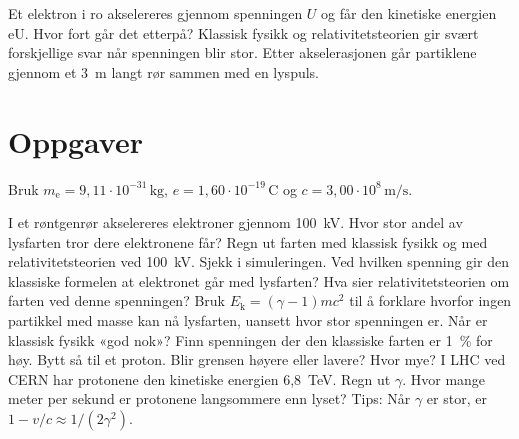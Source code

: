 \documentclass[11pt]{article}
\begin{document}

Et elektron i ro akselereres gjennom spenningen $U$ og får den kinetiske energien eU. Hvor fort går det etterpå? Klassisk fysikk og relativitetsteorien gir svært forskjellige svar når spenningen blir stor. Etter akselerasjonen går partiklene gjennom et 3~m langt rør sammen med en lyspuls.

\section*{Oppgaver}

Bruk $m_{\mathrm{e}} = 9{,}11 \cdot 10^{-31}\,\mathrm{kg}$, $e = 1{,}60 \cdot 10^{-19}\,\mathrm{C}$ og $c = 3{,}00 \cdot 10^{8}\,\mathrm{m/s}$.

\begin{oppgaveliste}
\oppgave {}I et røntgenrør akselereres elektroner gjennom 100~kV. Hvor stor andel av lysfarten tror dere elektronene får?
\svar
\oppgave {}Regn ut farten med klassisk fysikk og med relativitetsteorien ved 100~kV. Sjekk i simuleringen.
\svar
\oppgave {}Ved hvilken spenning gir den klassiske formelen at elektronet går med lysfarten? Hva sier relativitetsteorien om farten ved denne spenningen?
\svar
\oppgave {}Bruk $E_{\mathrm{k}} = (γ - 1)mc^{2}$ til å forklare hvorfor ingen partikkel med masse kan nå lysfarten, uansett hvor stor spenningen er.
\svar
\oppgave {}Når er klassisk fysikk «god nok»? Finn spenningen der den klassiske farten er 1~\% for høy. Bytt så til et proton. Blir grensen høyere eller lavere? Hvor mye?
\svar
\oppgave {}I LHC ved CERN har protonene den kinetiske energien 6,8~TeV. Regn ut $γ$. Hvor mange meter per sekund er protonene langsommere enn lyset? Tips: Når $γ$ er stor, er $1 - v/c \approx 1/(2γ^{2})$.
\svar
\end{oppgaveliste}
\end{document}
